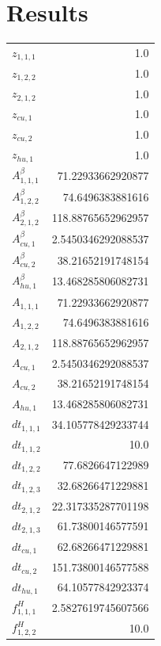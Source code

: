\documentclass{article}%
\makeatletter
\let\mcnewpage=\newpage%
\newcommand{\TrickSupertabularIntoMulticols}{%
\renewcommand\newpage{%
\if@firstcolumn%
\hrule width\linewidth height0pt%
\columnbreak%
\else%
\mcnewpage%
\fi%
}%
}%
\makeatother
\begin{document}
\section{Results}%
\thispagestyle{plain}%
\begin{multicols*}{3}%
\TrickSupertabularIntoMulticols%
%
\begin{supertabular}{lr}%
	$z_{1,1,1}$ & 1.0 \\%
	$z_{1,2,2}$ & 1.0 \\%
	$z_{2,1,2}$ & 1.0 \\%
	$z_{cu,1}$ & 1.0 \\%
	$z_{cu,2}$ & 1.0 \\%
	$z_{hu,1}$ & 1.0 \\%
	$A_{1,1,1}^{\beta}$ & 71.22933662920877 \\%
	$A_{1,2,2}^{\beta}$ & 74.6496383881616 \\%
	$A_{2,1,2}^{\beta}$ & 118.88765652962957 \\%
	$A_{cu,1}^{\beta}$ & 2.5450346292088537 \\%
	$A_{cu,2}^{\beta}$ & 38.21652191748154 \\%
	$A_{hu,1}^{\beta}$ & 13.468285806082731 \\%
	$A_{1,1,1}$ & 71.22933662920877 \\%
	$A_{1,2,2}$ & 74.6496383881616 \\%
	$A_{2,1,2}$ & 118.88765652962957 \\%
	$A_{cu,1}$ & 2.5450346292088537 \\%
	$A_{cu,2}$ & 38.21652191748154 \\%
	$A_{hu,1}$ & 13.468285806082731 \\%
	$dt_{1,1,1}$ & 34.105778429233744 \\%
	$dt_{1,1,2}$ & 10.0 \\%
	$dt_{1,2,2}$ & 77.6826647122989 \\%
	$dt_{1,2,3}$ & 32.68266471229881 \\%
	$dt_{2,1,2}$ & 22.317335287701198 \\%
	$dt_{2,1,3}$ & 61.73800146577591 \\%
	$dt_{cu,1}$ & 62.68266471229881 \\%
	$dt_{cu,2}$ & 151.73800146577588 \\%
	$dt_{hu,1}$ & 64.10577842923374 \\%
	$f_{1,1,1}^{H}$ & 2.5827619745607566 \\%
	$f_{1,2,2}^{H}$ & 10.0 \\%

\end{supertabular}
\end{multicols*}
\end{document}
